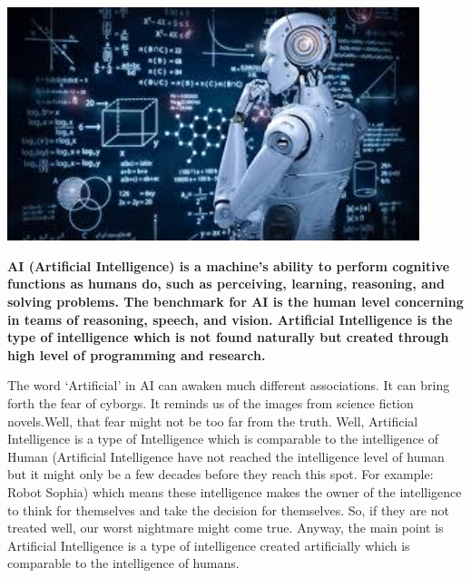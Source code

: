\documentclass{article}
\begin{document}
\noindent 
\includegraphics[width=12cm]{Artificial intelligence.jpg}\par
 {\large \bf AI (Artificial Intelligence) is a machine’s ability to perform cognitive functions as humans do, such as perceiving, learning, reasoning, and solving problems. The benchmark for AI is the human level concerning in teams of reasoning, speech, and vision. Artificial Intelligence is the type of intelligence which is not found naturally but created through high level of programming and research.\par

The word ‘Artificial’ in AI can awaken much different associations. It can bring forth the fear of cyborgs. It reminds us of the images from science fiction novels.Well, that fear might not be too far from the truth. Well, Artificial Intelligence is a type of Intelligence which is comparable to the intelligence of Human (Artificial Intelligence have not reached the intelligence level of human but it might only be a few decades before they reach this spot. For example: Robot Sophia) which means these intelligence makes the owner of the intelligence to think for themselves and take the decision for themselves. So, if they are not treated well, our worst nightmare might come true. Anyway, the main point is Artificial Intelligence is a type of intelligence created artificially which is comparable to the intelligence of humans.
   \par \linebreak}
  
 
 
\newpage
\end{document}
